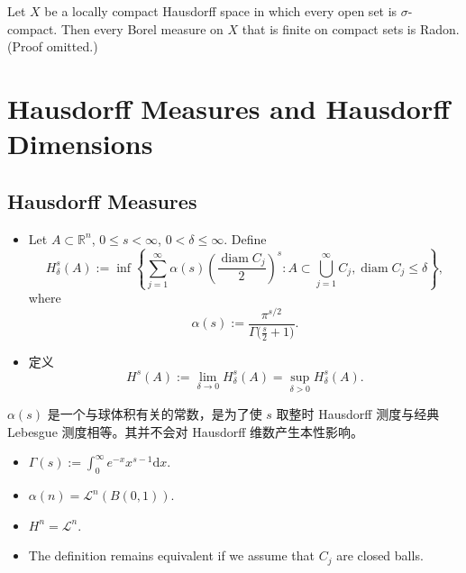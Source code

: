     \begin{theorem}
        Let $X$ be a locally compact Hausdorff space in which every open set is $\sigma$-compact. Then every Borel measure on $X$ that is finite on compact sets is Radon. (Proof omitted.)
    \end{theorem}

    \section{Hausdorff Measures and Hausdorff Dimensions}

    \subsection{Hausdorff Measures}

    \begin{definition}
        \begin{itemize}
            \item[(i)] 
                Let $A\subset \mathbb{R}^{n}$, $0\leq s<\infty$, $0< \delta \leq \infty$. Define
                \[
                H_{\delta}^{s}(A):= \inf\left\{  \sum _{j=1}^{\infty}\alpha(s)\left( \frac{\operatorname{diam}C_{j}}{2} \right)^{s}:A\subset\bigcup _{j=1}^{\infty}C_{j}  ,\operatorname{diam}C_{j}\leq \delta\right\},
                \]
                where
                \[
                \alpha(s):= \frac{\pi ^{s/2}}{\Gamma\big( \frac{s}{2}+1 \big)}.
                \]
            \item[(ii)] 定义
                \[
                H^{s}(A):=\lim_{ \delta \to 0 } H_{\delta}^{s}(A)=\sup_{\delta>0}H_{\delta}^{s}(A).
                \]
        \end{itemize}
    \end{definition}

    \begin{remark}
        $\alpha(s)$ 是一个与球体积有关的常数，是为了使 $s$ 取整时 Hausdorff 测度与经典 Lebesgue 测度相等。其并不会对 Hausdorff 维数产生本性影响。
    \end{remark}

    \begin{remark}
        \begin{itemize}
            \item[(i)] $\Gamma(s):= \int _{0}^{\infty}e^{-x}x^{s-1}\mathrm{d}x$.
            \item[(ii)] $\alpha(n)=\mathcal{L}^{n}(B(0,1))$.
            \item[(iii)] $H^{n}=\mathcal{L}^{n}$.
            \item[(iv)] The definition remains equivalent if we assume that $C_{j}$ are closed balls.
        \end{itemize}
    \end{remark}

